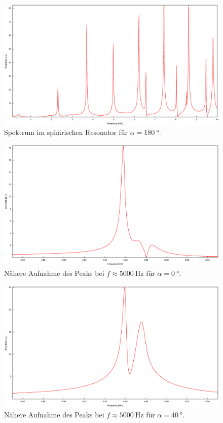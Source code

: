 \begin{figure}
\centering
\includegraphics[width=\linewidth-60pt,height=\textheight-60pt,keepaspectratio]{FP-V23data/2.1_180degree.eps}
\caption{Spektrum im sphärischen Resonator für $\alpha=\SI{180}{\degree}$.}
\label{fig:Overview2}
\end{figure}

\begin{figure}
\centering
\includegraphics[width=\linewidth-60pt,height=\textheight-60pt,keepaspectratio]{FP-V23data/2.2_0degree.eps}
\caption{Nähere Aufnahme des Peaks bei $f\approx\SI{5000}{\hertz}$ für $\alpha=\SI{0}{\degree}$.}
\label{fig:5k_Peak1}
\end{figure}

\begin{figure}
\centering
\includegraphics[width=\linewidth-60pt,height=\textheight-60pt,keepaspectratio]{FP-V23data/2.2_40degree.eps}
\caption{Nähere Aufnahme des Peaks bei $f\approx\SI{5000}{\hertz}$ für $\alpha=\SI{40}{\degree}$.}
\label{fig:5k_Peak2}
\end{figure}

